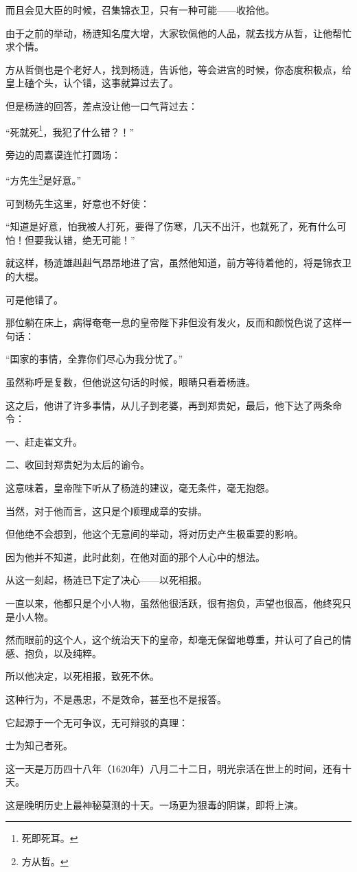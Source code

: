 \begin{multicols}{\theparacolNo}
而且会见大臣的时候，召集锦衣卫，只有一种可能——收拾他。

由于之前的举动，杨涟知名度大增，大家钦佩他的人品，就去找方从哲，让他帮忙求个情。

方从哲倒也是个老好人，找到杨涟，告诉他，等会进宫的时候，你态度积极点，给皇上磕个头，认个错，这事就算过去了。

但是杨涟的回答，差点没让他一口气背过去：

“死就死\footnote{死即死耳。}，我犯了什么错？！”

旁边的周嘉谟连忙打圆场：

“方先生\footnote{方从哲。}是好意。”

可到杨先生这里，好意也不好使：

“知道是好意，怕我被人打死，要得了伤寒，几天不出汗，也就死了，死有什么可怕！但要我认错，绝无可能！”

就这样，杨涟雄赳赳气昂昂地进了宫，虽然他知道，前方等待着他的，将是锦衣卫的大棍。

可是他错了。

那位躺在床上，病得奄奄一息的皇帝陛下非但没有发火，反而和颜悦色说了这样一句话：

“国家的事情，全靠你们尽心为我分忧了。”

虽然称呼是复数，但他说这句话的时候，眼睛只看着杨涟。

这之后，他讲了许多事情，从儿子到老婆，再到郑贵妃，最后，他下达了两条命令：

一、赶走崔文升。

二、收回封郑贵妃为太后的谕令。

这意味着，皇帝陛下听从了杨涟的建议，毫无条件，毫无抱怨。

当然，对于他而言，这只是个顺理成章的安排。

但他绝不会想到，他这个无意间的举动，将对历史产生极重要的影响。

因为他并不知道，此时此刻，在他对面的那个人心中的想法。

从这一刻起，杨涟已下定了决心——以死相报。

一直以来，他都只是个小人物，虽然他很活跃，很有抱负，声望也很高，他终究只是小人物。

然而眼前的这个人，这个统治天下的皇帝，却毫无保留地尊重，并认可了自己的情感、抱负，以及纯粹。

所以他决定，以死相报，致死不休。

这种行为，不是愚忠，不是效命，甚至也不是报答。

它起源于一个无可争议，无可辩驳的真理：

士为知己者死。

这一天是万历四十八年（1620年）八月二十二日，明光宗活在世上的时间，还有十天。

这是晚明历史上最神秘莫测的十天。一场更为狠毒的阴谋，即将上演。
\ifnum{}
	\end{multicols}
\fi
\newpage

